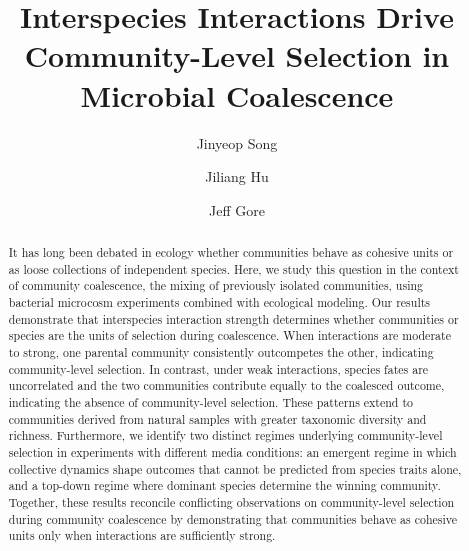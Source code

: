 
\title{Interspecies Interactions Drive Community-Level Selection in Microbial Coalescence}




\author[1]{Jinyeop Song}
\author[1]{Jiliang Hu}
\author[1]{Jeff Gore}


\date{}

\maketitle

\begin{abstract}
It has long been debated in ecology whether communities behave as cohesive units or as loose collections of independent species. Here, we study this question in the context of community coalescence, the mixing of previously isolated communities, using bacterial microcosm experiments combined with ecological modeling. Our results demonstrate that interspecies interaction strength determines whether communities or species are the units of selection during coalescence. When interactions are moderate to strong, one parental community consistently outcompetes the other, indicating community-level selection. In contrast, under weak interactions, species fates are uncorrelated and the two communities contribute equally to the coalesced outcome, indicating the absence of community-level selection. These patterns extend to communities derived from natural samples with greater taxonomic diversity and richness. Furthermore, we identify two distinct regimes underlying community-level selection in experiments with different media conditions: an emergent regime in which collective dynamics shape outcomes that cannot be predicted from species traits alone, and a top-down regime where dominant species determine the winning community. Together, these results reconcile conflicting observations on community-level selection during community coalescence by demonstrating that communities behave as cohesive units only when interactions are sufficiently strong.
\end{abstract}

\newpage
